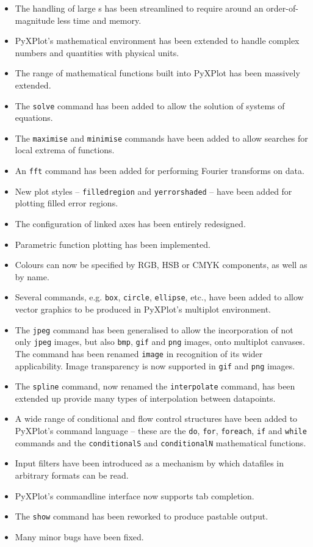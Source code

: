 \begin{itemize}
\item The handling of large \datafile s has been streamlined to require around an order-of-magnitude less time and memory.
\item PyXPlot's mathematical environment has been extended to handle complex numbers and quantities with physical units.
\item The range of mathematical functions built into PyXPlot has been massively extended.
\item The {\tt solve} command has been added to allow the solution of systems of equations.
\item The {\tt maximise} and {\tt minimise} commands have been added to allow searches for local extrema of functions.
\item An {\tt fft} command has been added for performing Fourier transforms on data.
\item New plot styles -- {\tt filledregion} and {\tt yerrorshaded} -- have been added for plotting filled error regions.
\item The configuration of linked axes has been entirely redesigned.
\item Parametric function plotting has been implemented.
\item Colours can now be specified by RGB, HSB or CMYK components, as well as by name.
\item Several commands, e.g. {\tt box}, {\tt circle}, {\tt ellipse}, etc., have been added to allow vector graphics to be produced in PyXPlot's multiplot environment.
\item The {\tt jpeg} command has been generalised to allow the incorporation of not only {\tt jpeg} images, but also {\tt bmp}, {\tt gif} and {\tt png} images, onto multiplot canvases. The command has been renamed {\tt image} in recognition of its wider applicability. Image transparency is now supported in {\tt gif} and {\tt png} images.
\item The {\tt spline} command, now renamed the {\tt interpolate} command, has been extended up provide many types of interpolation between datapoints.
\item A wide range of conditional and flow control structures have been added to PyXPlot's command language -- these are the {\tt do}, {\tt for}, {\tt foreach}, {\tt if} and {\tt while} commands and the {\tt cond\-ition\-alS} and {\tt con\-dition\-alN} mathematical functions.
\item Input filters have been introduced as a mechanism by which datafiles in arbitrary formats can be read.
\item PyXPlot's commandline interface now supports tab completion.
\item The {\tt show} command has been reworked to produce pastable output.
\item Many minor bugs have been fixed.
\end{itemize}

